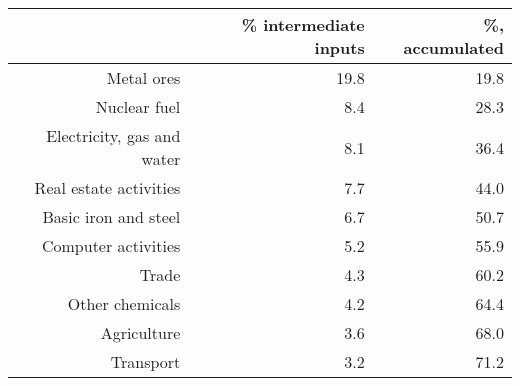 \begin{table}[ht]
\centering
\begin{tabular}{rrr}
  \hline
 & \% intermediate inputs & \%, accumulated \\ 
  \hline
Metal ores & 19.8 & 19.8 \\ 
  Nuclear fuel & 8.4 & 28.3 \\ 
  Electricity, gas and water & 8.1 & 36.4 \\ 
  Real estate activities & 7.7 & 44.0 \\ 
  Basic iron and steel & 6.7 & 50.7 \\ 
  Computer activities & 5.2 & 55.9 \\ 
  Trade & 4.3 & 60.2 \\ 
  Other chemicals & 4.2 & 64.4 \\ 
  Agriculture & 3.6 & 68.0 \\ 
  Transport & 3.2 & 71.2 \\ 
   \hline
\end{tabular}
\end{table}
